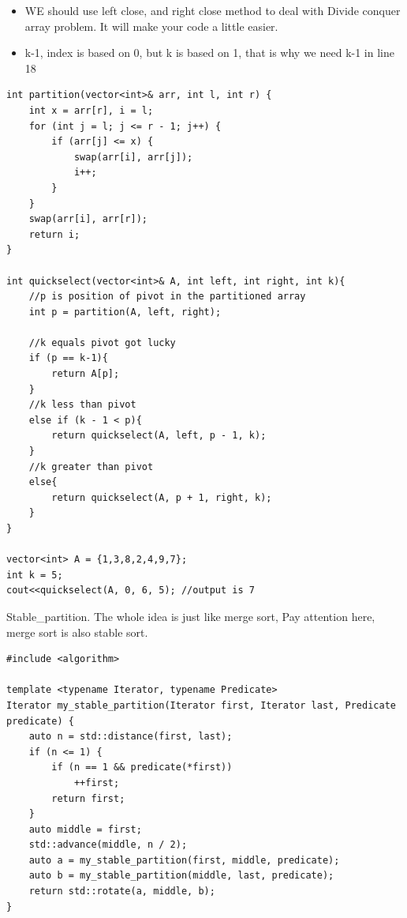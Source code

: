 \documentclass[a4paper,11pt,twoside]{book}
\begin{document}
\begin{itemize}
	\item WE should use left close, and right close method to deal with Divide conquer array problem. It will make your code a little easier. 
	
	\item k-1, index is based on 0, but k is based on 1, that is why we need k-1 in line 18
\end{itemize}	
	
\begin{lstlisting}
int partition(vector<int>& arr, int l, int r) {
	int x = arr[r], i = l;
	for (int j = l; j <= r - 1; j++) {
		if (arr[j] <= x) {
			swap(arr[i], arr[j]);
			i++;
		}
	}
	swap(arr[i], arr[r]);
	return i;
}

int quickselect(vector<int>& A, int left, int right, int k){
	//p is position of pivot in the partitioned array
	int p = partition(A, left, right);
	
	//k equals pivot got lucky
	if (p == k-1){
		return A[p];
	}
	//k less than pivot
	else if (k - 1 < p){
		return quickselect(A, left, p - 1, k);
	}
	//k greater than pivot
	else{
		return quickselect(A, p + 1, right, k);
	}
}

vector<int> A = {1,3,8,2,4,9,7};
int k = 5;
cout<<quickselect(A, 0, 6, 5); //output is 7
\end{lstlisting}
	
	\par Stable\_partition. The whole idea is just like merge sort, Pay attention here, merge sort is also stable sort. 
\begin{lstlisting}
#include <algorithm>

template <typename Iterator, typename Predicate>
Iterator my_stable_partition(Iterator first, Iterator last, Predicate predicate) {
	auto n = std::distance(first, last);
	if (n <= 1) {
		if (n == 1 && predicate(*first))
			++first;
		return first;
	}
	auto middle = first;
	std::advance(middle, n / 2);
	auto a = my_stable_partition(first, middle, predicate);
	auto b = my_stable_partition(middle, last, predicate);
	return std::rotate(a, middle, b);
}	
\end{lstlisting}
	
\end{document}
